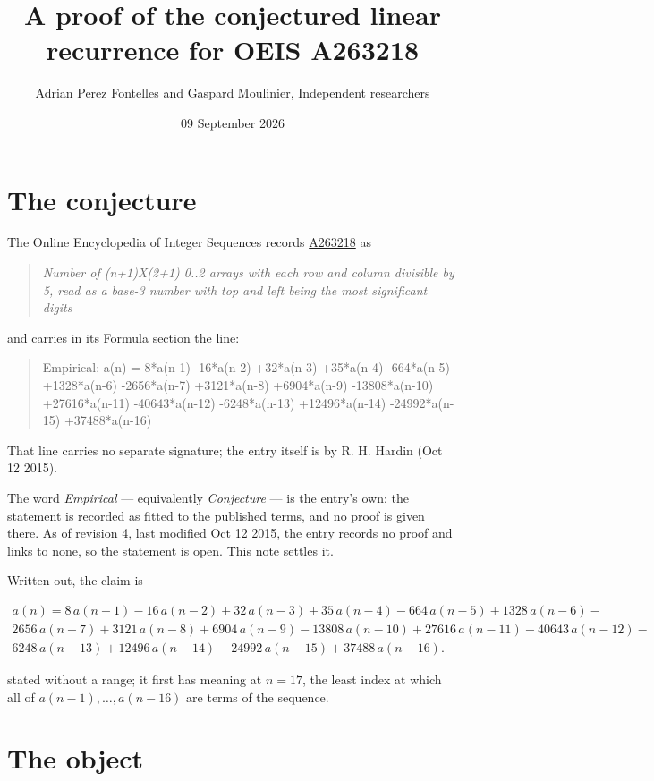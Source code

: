 \documentclass[11pt]{article}
\title{A proof of the conjectured linear recurrence for OEIS A263218}
\author{Adrian Perez Fontelles and Gaspard Moulinier, Independent researchers}
\date{09 September 2026}
\theoremstyle{definition}
\begin{document}
\maketitle
\section{The conjecture}

The Online Encyclopedia of Integer Sequences records \href{https://oeis.org/A263218}{A263218} as

\begin{quote}\itshape Number of (n+1)X(2+1) 0..2 arrays with each row and column divisible by 5, read as a base-3 number with top and left being the most significant digits\end{quote}

and carries in its Formula section the line:

\begin{quote}\ttfamily Empirical: a(n) = 8*a(n-1) -16*a(n-2) +32*a(n-3) +35*a(n-4) -664*a(n-5) +1328*a(n-6) -2656*a(n-7) +3121*a(n-8) +6904*a(n-9) -13808*a(n-10) +27616*a(n-11) -40643*a(n-12) -6248*a(n-13) +12496*a(n-14) -24992*a(n-15) +37488*a(n-16)\end{quote}

That line carries no separate signature; the entry itself is by R. H. Hardin (Oct 12 2015).

The word {\itshape Empirical} --- equivalently {\itshape Conjecture} --- is the entry's own: the statement is recorded as fitted to the published terms, and no proof is given there. As of revision 4, last modified Oct 12 2015, the entry records no proof and links to none, so the statement is open. This note settles it.

Written out, the claim is

\begin{multline*} a(n) = 8\,a(n-1) - 16\,a(n-2) + 32\,a(n-3) + 35\,a(n-4) - 664\,a(n-5) + 1328\,a(n-6) - \\ 2656\,a(n-7) + 3121\,a(n-8) + 6904\,a(n-9) - 13808\,a(n-10) + 27616\,a(n-11) - 40643\,a(n-12) - \\ 6248\,a(n-13) + 12496\,a(n-14) - 24992\,a(n-15) + 37488\,a(n-16). \end{multline*}

stated without a range; it first has meaning at $n = 17$, the least index at which all of $a(n-1),\dots,a(n-16)$ are terms of the sequence.

\section{The object}
\end{document}
